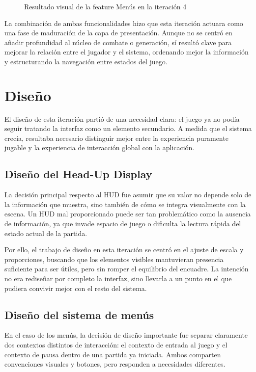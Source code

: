 \begin{enumerate}
\begin{figure}[H]
\begin{center}
\caption{Resultado visual de la feature Menús en la iteración 4}
\label{fig:iteracion4-feature-menus}
\end{center}
\end{figure}
\end{enumerate}

La combinación de ambas funcionalidades hizo que esta iteración actuara como una fase de
maduración de la capa de presentación. Aunque no se centró en añadir profundidad al núcleo
de combate o generación, sí resultó clave para mejorar la relación entre el jugador y el
sistema, ordenando mejor la información y estructurando la navegación entre estados del
juego.

\section{Diseño}
El diseño de esta iteración partió de una necesidad clara: el juego ya no podía seguir
tratando la interfaz como un elemento secundario. A medida que el sistema crecía, resultaba
necesario distinguir mejor entre la experiencia puramente jugable y la experiencia de
interacción global con la aplicación.

\subsection{Diseño del Head-Up Display}
La decisión principal respecto al HUD fue asumir que su valor no depende solo de la
información que muestra, sino también de cómo se integra visualmente con la escena. Un HUD
mal proporcionado puede ser tan problemático como la ausencia de información, ya que invade
espacio de juego o dificulta la lectura rápida del estado actual de la partida.

Por ello, el trabajo de diseño en esta iteración se centró en el ajuste de escala y
proporciones, buscando que los elementos visibles mantuvieran presencia suficiente para ser
útiles, pero sin romper el equilibrio del encuadre. La intención no era rediseñar por
completo la interfaz, sino llevarla a un punto en el que pudiera convivir mejor con el
resto del sistema.

\subsection{Diseño del sistema de menús}
En el caso de los menús, la decisión de diseño importante fue separar claramente dos
contextos distintos de interacción: el contexto de entrada al juego y el contexto de pausa
dentro de una partida ya iniciada. Ambos comparten convenciones visuales y botones, pero
responden a necesidades diferentes.

